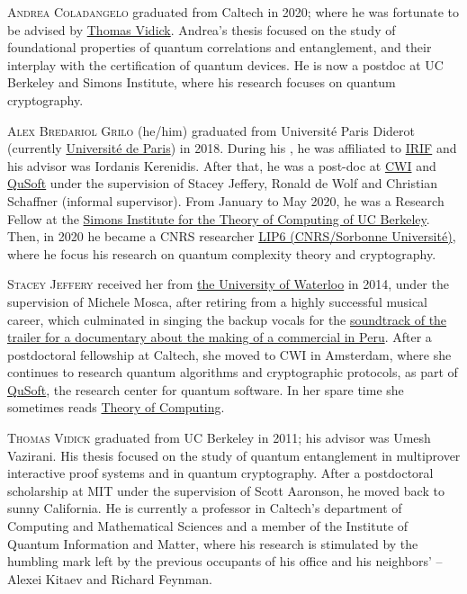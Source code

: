 \documentclass{toc}
\begin{document}
\begin{tocaboutauthors}
\begin{tocabout}[coladangelo]  \textsc{Andrea Coladangelo} graduated from Caltech in
  2020; where he was fortunate to be advised by
  \href{http://cms.caltech.edu/~vidick}{Thomas Vidick}. Andrea's thesis focused on the study of foundational properties of quantum correlations and entanglement, and their interplay with the certification of quantum devices. He is now a postdoc at UC Berkeley and Simons Institute, where his research focuses on quantum cryptography. 
\end{tocabout}
\begin{tocabout}[grilo]
\textsc{Alex Bredariol Grilo} (he/him) graduated from   Universit\'{e} Paris Diderot (currently   \href{https://u-paris.fr/en/}{Universit\'e de Paris}) in 2018. During his \phd{}, he was affiliated to  \href{https://www.irif.fr}{IRIF} and his advisor was Iordanis Kerenidis. After that, he was a post-doc at \href{https://cwi.nl}{CWI} and \href{https://qusoft.nl}{QuSoft} under the supervision of Stacey Jeffery, Ronald de Wolf and Christian Schaffner (informal supervisor). From January to May 2020, he was a Research Fellow at the \href{https://simons.berkeley.edu/}{Simons Institute for the Theory of Computing of UC Berkeley}. Then, in 2020 he became a CNRS researcher  \href{https://lip6.fr}{LIP6 (CNRS/Sorbonne Universit\'e)}, where he focus his research on quantum complexity theory and cryptography.
\end{tocabout}
\begin{tocabout}[jeffery]  \textsc{Stacey Jeffery}
  received her \phd{} from 
  \href{http://uwaterloo.ca}{the University of Waterloo} in
  2014, under the supervision of Michele Mosca, after retiring from a highly successful musical career, which culminated in singing the backup vocals for the \href{https://www.youtube.com/watch?v=S15lHGMdubI}{soundtrack of the trailer for a documentary about the making of a commercial in Peru}. After a postdoctoral fellowship at Caltech, she moved to CWI in Amsterdam, where she continues to research quantum algorithms and cryptographic protocols, as part of \href{http://qusoft.org}{QuSoft}, the research center for quantum software.     In her spare time she sometimes reads
  \href{http://theoryofcomputing.org}{\textsf{Theory of Computing}}.
\end{tocabout}
\begin{tocabout}[vidick]
\textsc{Thomas Vidick} graduated from UC Berkeley in 2011; his advisor was Umesh Vazirani. His thesis focused on the study of quantum entanglement in multiprover interactive proof systems and in quantum cryptography. After a postdoctoral scholarship at MIT under the supervision of Scott Aaronson, he moved back to sunny California. He is currently a professor in Caltech's department of Computing and Mathematical Sciences and a member of the Institute of Quantum Information and Matter, where his research is stimulated by the humbling mark left by the previous occupants of his office and his neighbors' -- Alexei Kitaev and Richard Feynman.
\end{tocabout}
\end{tocaboutauthors}
\end{document}
